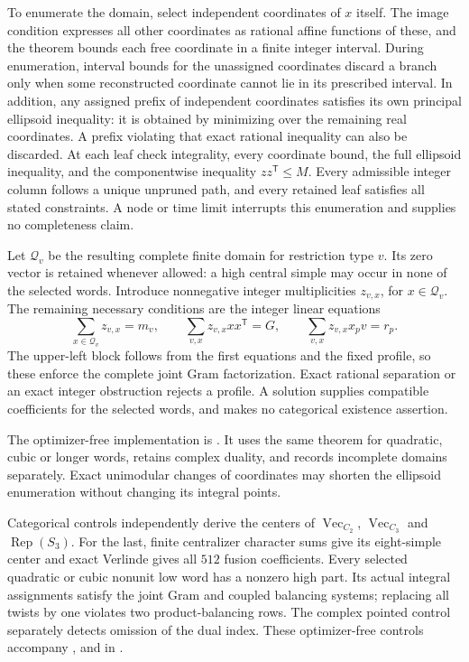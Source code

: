 To enumerate the domain, select independent coordinates of $x$ itself.
The image condition expresses all other coordinates as rational affine
functions of these, and the theorem bounds each free coordinate in a
finite integer interval. During enumeration, interval bounds for the
unassigned coordinates discard a branch only when some reconstructed
coordinate cannot lie in its prescribed interval. In addition, any
assigned prefix of independent coordinates satisfies its own principal
ellipsoid inequality: it is obtained by minimizing over the remaining
real coordinates. A prefix violating that exact rational inequality can
also be discarded. At each leaf check integrality, every coordinate
bound, the full ellipsoid inequality, and the componentwise inequality
$zz^{\mathsf T}\le M$.
Every admissible integer column follows a unique unpruned path, and
every retained leaf satisfies all stated constraints. A node or time
limit interrupts this enumeration and supplies no completeness claim.

Let $\mathcal Q_v$ be the resulting complete finite domain for restriction
type $v$. Its zero vector is retained whenever allowed: a high central
simple may occur in none of the selected words. Introduce nonnegative
integer multiplicities $z_{v,x}$, for $x\in\mathcal Q_v$. The remaining
necessary conditions are the integer linear equations
\begin{equation}\label{eq:unified-word-count-system}
 \sum_{x\in\mathcal Q_v}z_{v,x}=m_v,
 \qquad \sum_{v,x}z_{v,x}xx^{\mathsf T}=G,
 \qquad \sum_{v,x}z_{v,x}x_pv=r_p.
\end{equation}
The upper-left block follows from the first equations and the fixed
profile, so these enforce the complete joint Gram factorization.
Exact rational separation or an exact integer obstruction rejects a
profile. A solution supplies compatible coefficients for the selected
words, and makes no categorical existence assertion.

The optimizer-free implementation is
. It uses the same theorem for quadratic,
cubic or longer words, retains complex duality, and records incomplete
domains separately. Exact unimodular changes of coordinates may shorten
the ellipsoid enumeration without changing its integral points.

Categorical controls independently derive the centers of
$\operatorname{Vec}_{C_2}$, $\operatorname{Vec}_{C_3}$ and
$\operatorname{Rep}(S_3)$. For the last, finite centralizer character sums
give its eight-simple center and exact Verlinde gives all $512$ fusion
coefficients. Every selected quadratic or cubic nonunit low word has a
nonzero high part. Its actual integral assignments satisfy the joint Gram
and coupled balancing systems; replacing all twists by one violates two
product-balancing rows. The complex pointed control separately detects
omission of the dual index. These optimizer-free controls accompany
,  and
 in
.

